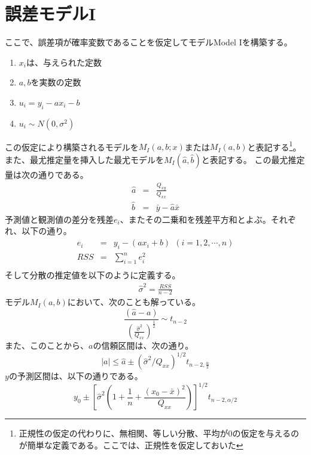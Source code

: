 \section{誤差モデルI}
ここで、誤差項が確率変数であることを仮定してモデルModel Iを構築する。
\begin{enumerate}
 \item $x_i$は、与えられた定数
 \item $a,b$を実数の定数
 \item $u_i = y_i-a x_i -b$
 \item $u_i \sim N(0,\sigma^2)$
\end{enumerate}
この仮定により構築されるモデルを$M_{I}(a,b; x)$または$M_I(a,b)$と表記する\footnote{正規性の仮定の代わりに、無相関、等しい分散、平均が$0$の仮定を与えるのが簡単な定義である。ここでは、正規性を仮定しておいた}。
また、最尤推定量を挿入した最尤モデルを$M_I(\hat{a},\hat{b})$と表記する。
この最尤推定量は次の通りである。
\begin{eqnarray*}
 \hat{a} &=& \frac{Q_{xy}}{Q_{xx}}\\
 \hat{b} &=& \bar{y}-\hat{a}\bar{x}
\end{eqnarray*}
予測値と観測値の差分を残差$e_i$、またその二乗和を残差平方和とよぶ。それぞれ、以下の通り。
\begin{eqnarray*}
 e_i &=& y_i - (ax_i+b)\ \ (i=1,2,\cdots,n)\\
 RSS &=& \sum_{i=1}^n e_i^2 \\
\end{eqnarray*}
そして分散の推定値を以下のように定義する。
\begin{eqnarray*}
 \hat{\sigma}^2 = \frac{RSS}{n-2}
\end{eqnarray*}
モデル$M_I(a,b)$において、次のことも解っている。
\begin{equation*}
 \frac{(\hat{a}-a)}{ \left( \frac{\hat{\sigma}^2}{Q_{xx}} \right)^\frac{1}{2}} \sim t_{n-2}
\end{equation*}
また、このことから、$a$の信頼区間は、次の通り。
\begin{equation*}
 |a| \leq \hat{a}\pm(\hat{\sigma}^2/Q_{xx})^{1/2}t_{n-2,\frac{\alpha}{2}}
\end{equation*}
$y$の予測区間は、以下の通りである。
\begin{equation*}
 y_0\pm\left[\hat{\sigma}^2\left( 1+\frac{1}{n} +\frac{(x_0-\bar{x})^2}{Q_{xx}} \right)\right]^{1/2}t_{n-2,\alpha/2}
\end{equation*}

